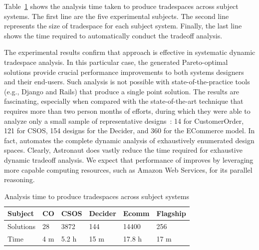 \documentclass{sig-alternate}
\begin{document}
Table~\ref{table:ts_time} shows the analysis time taken to produce tradespaces across subject systems. The first line are the five experimental subjects. The second line represents the size of tradespace for each subject system.  Finally, the last line shows the time required to automatically conduct the tradeoff analysis.





The experimental results confirm that \@approach approach is effective in systematic dynamic tradespace analysis. In this particular case, the generated Pareto-optimal solutions provide crucial performance improvements to both systems designers and their end-users. Such analysis is not possible with state-of-the-practice tools (e.g., Django and Rails) that produce a single point solution.
The results are fascinating, especially when compared with the state-of-the-art technique that requires more than two person months of efforts, during which they were able to analyze only a small sample of representative designs~\cite{trademaker}:  14 for CustomerOrder, 121 for CSOS, 154 designs for the Decider, and 360 for the ECommerce model. In fact, \@approach automates the complete dynamic analysis of exhaustively enumerated design spaces. Clearly, Astronaut does vastly reduce the time required for exhaustive dynamic tradeoff analysis. We expect that performance of \@approach improves by leveraging more capable computing resources, such as Amazon Web Services, for its parallel reasoning.
 

\begin{table}[ht]
\begin{tabular}{l|l|l|l|l|l}
\hline
\hline
Subject & CO & CSOS & Decider & Ecomm & Flagship \\ \hline
Solutions & 28 & 3872 & 144 & 14400 & 256 \\ \hline
Time & 4 m & 5.2 h & 15 m & 17.8 h & 17 m \\ \hline
\hline
\end{tabular}
\caption{Analysis time to produce tradespaces across subject systems}
\label{table:ts_time}
\end{table}
 
\end{document}
